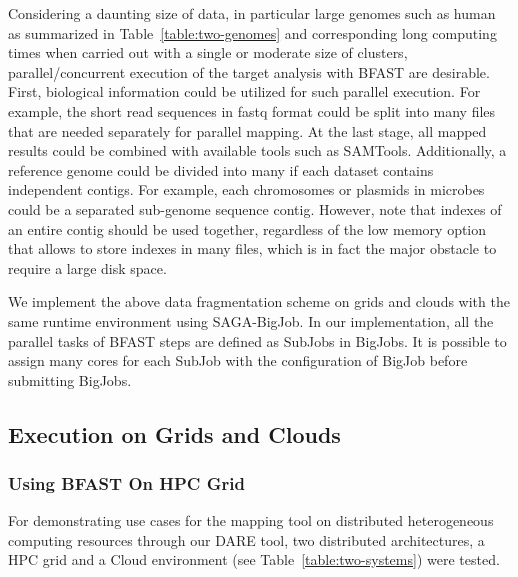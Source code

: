 \documentclass{acm_proc_article-sp}
\begin{document}
Considering a daunting size of data, in particular large genomes such as human as summarized in 
Table~\ref{table:two-genomes} and corresponding long computing times when carried out with a 
single or moderate size of clusters, parallel/concurrent execution of the target analysis with BFAST are desirable. 
 First, biological information could be utilized for such parallel execution. 
 For example, the short read sequences in fastq format could be split into many files that are 
 needed separately for parallel mapping.  At the last stage, all mapped results could be combined 
 with available tools such as SAMTools\cite{samtools}.   Additionally, a reference genome could be 
 divided into many if each dataset contains independent contigs.  For example, each chromosomes 
 or plasmids in microbes could be a separated sub-genome sequence contig.  However, note that 
 indexes of an entire contig should be used together, regardless of the low memory option that allows 
 to store indexes in many files, which is in fact the major obstacle to require a large disk space.

We implement the above data fragmentation scheme on grids and clouds with the same runtime environment using 
SAGA-BigJob\cite{saga-royalsoc,saga-ccgrid10, ecmls10}.  In our implementation, all the parallel tasks of BFAST 
steps are defined as SubJobs in BigJobs.  It is possible to assign many cores for each SubJob 
with the configuration of BigJob before submitting BigJobs. 
  

\subsection{Execution on Grids and Clouds}

\subsubsection{Using BFAST On HPC Grid}
For demonstrating use cases for the mapping tool on distributed
heterogeneous computing resources through our DARE tool, two distributed architectures, a HPC grid and a Cloud environment (see
Table~\ref{table:two-systems}) were tested.
\end{document}
